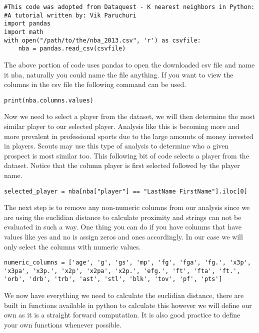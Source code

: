 \begin{lstlisting}
#This code was adopted from Dataquest - K nearest neighbors in Python:
#A tutorial written by: Vik Paruchuri
import pandas
import math
with open("/path/to/the/nba_2013.csv", 'r') as csvfile:
    nba = pandas.read_csv(csvfile)
\end{lstlisting}

The above portion of code uses pandas to open the downloaded csv file
and name it nba, naturally you could name the file anything. If you
want to view the columns in the csv file the following command can be
used.

\begin{lstlisting}
print(nba.columns.values)
\end{lstlisting} 

Now we need to select a player from the dataset, we will then
determine the most similar player to our selected player. Analysis
like this is becoming more and more prevalent in professional sports
due to the large amounts of money invested in players. Scouts may use
this type of analysis to determine who a given prospect is most
similar too. This following bit of code selects a player from the
dataset. Notice that the column player is first selected followed by
the player name.  

\begin{lstlisting}
selected_player = nba[nba["player"] == "LastName FirstName"].iloc[0]
\end{lstlisting} 

The next step is to remove any non-numeric columns from our analysis
since we are using the euclidian distance to calculate proximity and
strings can not be evaluated in such a way. One thing you can do if
you have columns that have values like yes and no is assign zeros and
ones accordingly. In our case we will only select the columns with
numeric values. 

\begin{lstlisting}
numeric_columns = ['age', 'g', 'gs', 'mp', 'fg', 'fga', 'fg.', 'x3p',
'x3pa', 'x3p.', 'x2p', 'x2pa', 'x2p.', 'efg.', 'ft', 'fta', 'ft.',
'orb', 'drb', 'trb', 'ast', 'stl', 'blk', 'tov', 'pf', 'pts']
\end{lstlisting} 

We now have everything we need to calculate the euclidian distance,
there are built in functions available in python to calculate this
however we will define our own as it is a straight forward
computation. It is also good practice to define your own functions
whenever possible. 

